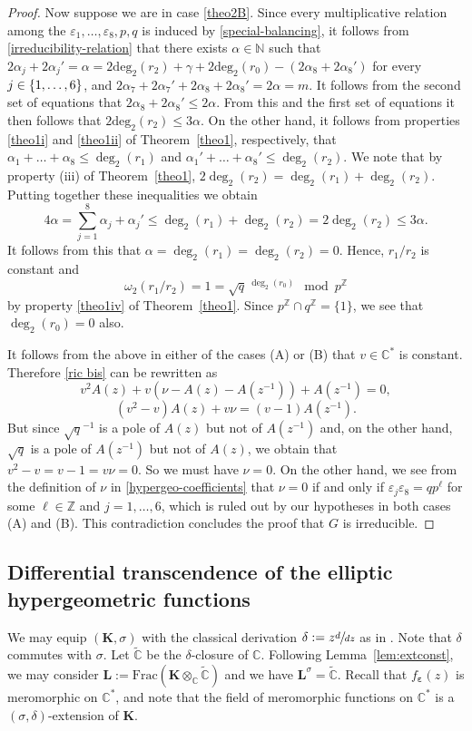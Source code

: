 \documentclass[10pt]{amsart}
\theoremstyle{definition}
\newcommand{\N}{\mathbb N}
\newcommand{\Z}{\mathbb Z}
\newcommand{\C}{\mathbb C}
\newcommand\K{\boldsymbol{K}}
\renewcommand\L{\boldsymbol{L}}
\let\d\delta
\let\s\sigma
\newcommand{\degr}[1]{\deg_{#1}}
\newcommand{\subeps}{\boldsymbol{\varepsilon}}
\let\Subsection\subsection\let\Subsubsection\subsubsection
\begin{document}
\begin{proof}
Now suppose we are in case \eqref{theo2B}. Since every multiplicative relation among the $\varepsilon_{1},\dots,\varepsilon_{8},p,q$ is induced by \eqref{special-balancing}, it follows from \eqref{irreducibility-relation} that there exists $\alpha\in\N$ such that $2\alpha_j+2\alpha_j'=\alpha=2\mathrm{deg}_2(r_2)+\gamma+2\mathrm{deg}_2(r_0)-(2\alpha_8+2\alpha_8')$ for every $j\in\nobreak\{1,\dots,6\}$, and $2\alpha_7+2\alpha_7'+2\alpha_8+2\alpha_8'=2\alpha=m$. It follows from the second set of equations that $2\alpha_8+2\alpha_8'\leq 2\alpha$. From this and the first set of equations it then follows that $2\mathrm{deg}_2(r_2)\leq 3\alpha$. On the other hand, it follows from properties \eqref{theo1i} and \eqref{theo1ii} of Theorem~\ref{theo1}, respectively, that $\alpha_1+\dots+\alpha_8\leq\degr{2}(r_1)$ and $\alpha_1'+\dots+\alpha_8'\leq\degr{2}(r_2)$. We note that by property (iii) of Theorem~\ref{theo1}, $2\degr{2}(r_2)=\degr{2}(r_1)+\degr{2}(r_2)$. Putting together these inequalities we obtain
\[
4\alpha=\sum_{j=1}^8\alpha_j+\alpha_j'\leq\degr{2}(r_1)+\degr{2}(r_2)=2\degr{2}(r_2)\leq 3\alpha.
\]
It follows from this that $\alpha=\degr{2}(r_1)=\degr{2}(r_2)=0$. Hence, $r_1/r_2$ is constant and
\[
\omega_2(r_1/r_2)=1=\sqrt{q}\,^{\degr{2}(r_0)} \mod p^\Z
\]
by property \eqref{theo1iv} of Theorem~\ref{theo1}. Since $p^\Z\cap q^\Z=\{1\}$, we see that ${\degr{2}(r_0)=0}$ also.

It follows from the above in either of the cases (A) or (B) that $v\in \C^{*}$ is constant. Therefore \eqref{ric bis} can be rewritten as
\begin{equation}\label{eq1}
v^{2}A(z)+v(\nu-A(z)-A(z^{-1}))+A(z^{-1})=0,
\end{equation}
\ie
\begin{equation}\label{eq1bis}
(v^{2}-v)A(z)+v\nu=(v-1)A(z^{-1}).
\end{equation}
But since $\sqrt{q}^{-1}$ is a pole of $A(z)$ but not of $A(z^{-1})$ and, on the other hand, $\sqrt{q}$ is a pole of $A(z^{-1})$ but not of $A(z)$, we obtain that $v^{2}-v=v-1=v\nu=0$. So we must have $\nu=0$. On the other hand, we see from the definition of $\nu$ in \eqref{hypergeo-coefficients} that $\nu=0$ if and only if $\varepsilon_j\varepsilon_8=qp^\ell$ for some $\ell\in\mathbb{Z}$ and $j=1,\dots,6$, which is ruled out by our hypotheses in both cases (A) and (B).
This contradiction concludes the proof that $G$ is irreducible.
\end{proof}

\Subsection{Differential transcendence of the elliptic hypergeometric functions}
We may equip $(\K,\s)$ with the classical derivation $\d:=z\sfrac{d}{dz}$ as in \cite[\S 3.1]{dreyfus2018nature}. Note that $\d$ commutes with $\s$. Let $\widetilde{\C}$ be the $\d$-closure of $\C$. Following Lemma~\ref{lem:extconst}, we may consider $\L:=\mathrm{Frac} (\K\otimes_{\C}\widetilde{\C})$ and we have $\L^{\s}= \widetilde{\C}$. Recall that $f_{\subeps}(z)$ is meromorphic on $\C^{*}$, and note that the field of meromorphic functions on $\C^*$ is a $(\sigma,\delta)$-extension of $\K$.
\end{document}
